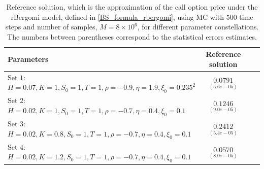 \FloatBarrier
\begin{table}[!h]
	\centering
	\begin{small}
	\begin{tabular}{l*{2}{c}r}
	\toprule[1.5pt]
		Parameters            & Reference solution    \\
		\hline

			Set $1$:	$H=0.07, K=1,S_0=1, T=1, \rho=-0.9, \eta=1.9,\xi_0=0.235^2$   & $\underset{(5.6e-05)}{0.0791}$  \\	

				Set $2$:	$H=0.02, K=1, S_0=1, T=1,\rho=-0.7, \eta=0.4,\xi_0=0.1$   & $\underset{(9.0e-05)}{0.1246}$  \\
					Set $3$:	$H=0.02, K=0.8,S_0=1,T=1, \rho=-0.7, \eta=0.4,\xi_0=0.1$   & $\underset{(5.4e-05)}{0.2412}$  \\
						Set $4$:	$H=0.02, K=1.2,S_0=1,T=1, \rho=-0.7, \eta=0.4,\xi_0=0.1$   & $\underset{(8.0e-05)}{0.0570}$  \\
	\bottomrule[1.25pt]
	\end{tabular}
\end{small}
	\caption{Reference solution, which is the  approximation of the call option price under the rBergomi model, defined in \eqref{BS_formula_rbergomi},  using MC with $500$ time steps and number of samples, $M=8 \times 10^6$, for different parameter constellations.  The numbers between parentheses correspond to the statistical errors estimates.}
	\label{table:Reference solution, using MC with $500$ time steps, of Call option price under rBergomi model, for different parameter constellation.}
\end{table}
\FloatBarrier


